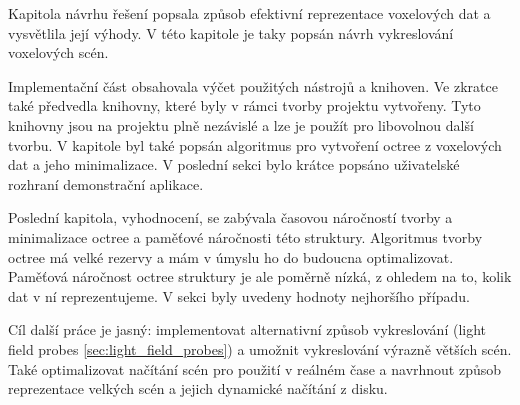 Kapitola návrhu řešení popsala způsob efektivní reprezentace voxelových dat a vysvětlila její výhody. V této kapitole je taky popsán návrh vykreslování voxelových scén.

Implementační část obsahovala výčet použitých nástrojů a knihoven. Ve zkratce také předvedla knihovny, které byly v rámci tvorby projektu vytvořeny. Tyto knihovny jsou na projektu plně nezávislé a lze je použít pro libovolnou další tvorbu. V kapitole byl také popsán algoritmus pro vytvoření octree z voxelových dat a jeho minimalizace. V poslední sekci bylo krátce popsáno uživatelské rozhraní demonstrační aplikace.

Poslední kapitola, vyhodnocení, se zabývala časovou náročností tvorby a minimalizace octree a paměťové náročnosti této struktury. Algoritmus tvorby octree má velké rezervy a mám v úmyslu ho do budoucna optimalizovat. Paměťová náročnost octree struktury je ale poměrně nízká, z ohledem na to, kolik dat v ní reprezentujeme. V sekci byly uvedeny hodnoty nejhoršího případu.

Cíl další práce je jasný: implementovat alternativní způsob vykreslování (light field probes \ref{sec:light_field_probes}) a umožnit vykreslování výrazně větších scén. Také optimalizovat načítání scén pro použití v reálném čase a navrhnout způsob reprezentace velkých scén a jejich dynamické načítání z disku.


